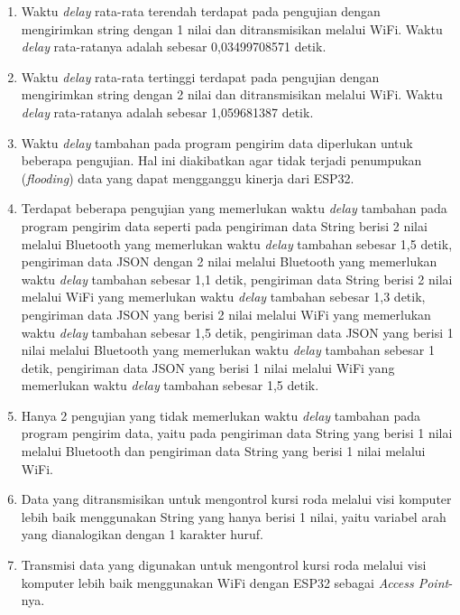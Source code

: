 \begin{enumerate}[nolistsep]

  \item Waktu \emph{delay} rata-rata terendah terdapat pada pengujian dengan mengirimkan string dengan 1 nilai dan ditransmisikan melalui WiFi. Waktu \emph{delay} rata-ratanya adalah sebesar 0,03499708571 detik.

  \item Waktu \emph{delay} rata-rata tertinggi terdapat pada pengujian dengan mengirimkan string dengan 2 nilai dan ditransmisikan melalui WiFi. Waktu \emph{delay} rata-ratanya adalah sebesar 1,059681387 detik.
  
  \item Waktu \emph{delay} tambahan pada program pengirim data diperlukan untuk beberapa pengujian. Hal ini diakibatkan agar tidak terjadi penumpukan (\emph{flooding}) data yang dapat mengganggu kinerja dari ESP32.

  \item Terdapat beberapa pengujian yang memerlukan waktu \emph{delay} tambahan pada program pengirim data seperti pada pengiriman data String berisi 2 nilai melalui Bluetooth yang memerlukan waktu \emph{delay} tambahan sebesar 1,5 detik, pengiriman data JSON dengan 2 nilai melalui Bluetooth yang memerlukan waktu \emph{delay} tambahan sebesar 1,1 detik, pengiriman data String berisi 2 nilai melalui WiFi yang memerlukan waktu \emph{delay} tambahan sebesar 1,3 detik, pengiriman data JSON yang berisi 2 nilai melalui WiFi yang memerlukan waktu \emph{delay} tambahan sebesar 1,5 detik, pengiriman data JSON yang berisi 1 nilai melalui Bluetooth yang memerlukan waktu \emph{delay} tambahan sebesar 1 detik, pengiriman data JSON yang berisi 1 nilai melalui WiFi yang memerlukan waktu \emph{delay} tambahan sebesar 1,5 detik.
  
  \item Hanya 2 pengujian yang tidak memerlukan waktu \emph{delay} tambahan pada program pengirim data, yaitu pada pengiriman data String yang berisi 1 nilai melalui Bluetooth dan pengiriman data String yang berisi 1 nilai melalui WiFi. 
  
  \item Data yang ditransmisikan untuk mengontrol kursi roda melalui visi komputer lebih baik menggunakan String yang hanya berisi 1 nilai, yaitu variabel arah yang dianalogikan dengan 1 karakter huruf. 
  
  \item Transmisi data yang digunakan untuk mengontrol kursi roda melalui visi komputer lebih baik menggunakan WiFi dengan ESP32 sebagai \emph{Access Point}-nya.

\end{enumerate}

